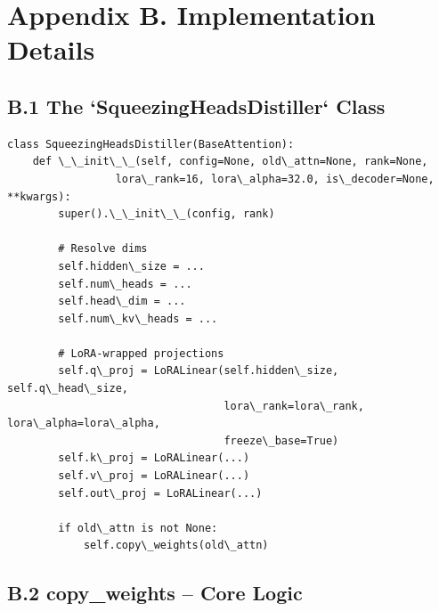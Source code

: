 
\section{Appendix B. Implementation Details}

\subsection{B.1 The `SqueezingHeadsDistiller` Class}

\begin{lstlisting}
class SqueezingHeadsDistiller(BaseAttention):
    def \_\_init\_\_(self, config=None, old\_attn=None, rank=None,
                 lora\_rank=16, lora\_alpha=32.0, is\_decoder=None, **kwargs):
        super().\_\_init\_\_(config, rank)
        
        # Resolve dims
        self.hidden\_size = ...
        self.num\_heads = ...
        self.head\_dim = ...
        self.num\_kv\_heads = ...
        
        # LoRA-wrapped projections
        self.q\_proj = LoRALinear(self.hidden\_size, self.q\_head\_size,
                                  lora\_rank=lora\_rank, lora\_alpha=lora\_alpha,
                                  freeze\_base=True)
        self.k\_proj = LoRALinear(...)
        self.v\_proj = LoRALinear(...)
        self.out\_proj = LoRALinear(...)
        
        if old\_attn is not None:
            self.copy\_weights(old\_attn)
\end{lstlisting}

\subsection{B.2 copy\_weights -- Core Logic}

